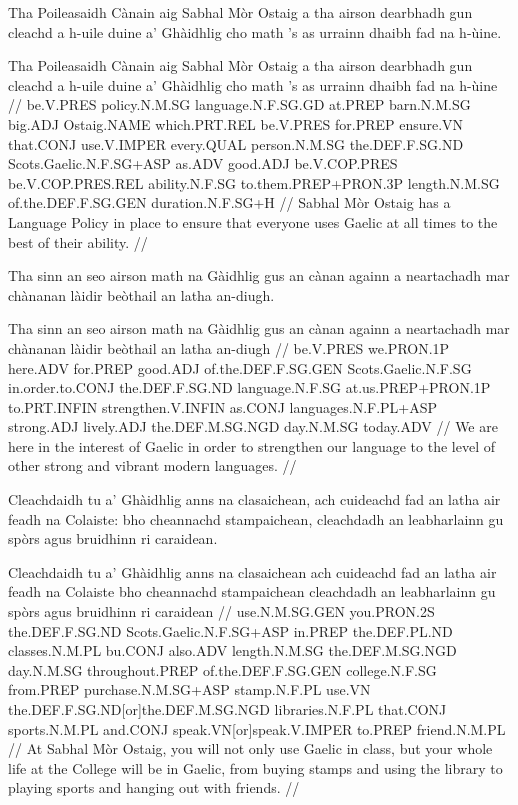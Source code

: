 \documentclass[a4paper,10pt]{article}
\begin{document}
\ex
\begingl
\glpre Tha Poileasaidh Cànain aig Sabhal Mòr Ostaig a tha airson dearbhadh gun cleachd a h-uile duine a' Ghàidhlig cho math 's as urrainn dhaibh fad na h-ùine. 

\vspace{4mm}
\gla Tha Poileasaidh Cànain aig Sabhal Mòr Ostaig a tha airson dearbhadh gun cleachd {a h-uile} duine a' Ghàidhlig cho math 's as urrainn dhaibh fad na h-ùine  //
\glb be.V.PRES policy.N.M.SG language.N.F.SG.GD at.PREP barn.N.M.SG big.ADJ Ostaig.NAME which.PRT.REL be.V.PRES for.PREP ensure.VN that.CONJ use.V.IMPER every.QUAL person.N.M.SG the.DEF.F.SG.ND Scots.Gaelic.N.F.SG+ASP as.ADV good.ADJ be.V.COP.PRES be.V.COP.PRES.REL ability.N.F.SG to.them.PREP+PRON.3P length.N.M.SG of.the.DEF.F.SG.GEN duration.N.F.SG+H  //
\glft Sabhal Mòr Ostaig has a Language Policy in place to ensure that everyone uses Gaelic at all times to the best of their ability. //
\endgl
\xe

\ex
\begingl
\glpre Tha sinn an seo airson math na Gàidhlig gus an cànan againn a neartachadh mar chànanan làidir beòthail an latha an-diugh. 

\vspace{4mm}
\gla Tha sinn {an seo} airson math na Gàidhlig gus an cànan againn a neartachadh mar chànanan làidir beòthail an latha an-diugh  //
\glb be.V.PRES we.PRON.1P here.ADV for.PREP good.ADJ of.the.DEF.F.SG.GEN Scots.Gaelic.N.F.SG in.order.to.CONJ the.DEF.F.SG.ND language.N.F.SG at.us.PREP+PRON.1P to.PRT.INFIN strengthen.V.INFIN as.CONJ languages.N.F.PL+ASP strong.ADJ lively.ADJ the.DEF.M.SG.NGD day.N.M.SG today.ADV  //
\glft We are here in the interest of Gaelic in order to strengthen our language to the level of other strong and vibrant modern languages. //
\endgl
\xe

\ex
\begingl
\glpre Cleachdaidh tu a' Ghàidhlig anns na clasaichean, ach cuideachd fad an latha air feadh na Colaiste: bho cheannachd stampaichean, cleachdadh an leabharlainn gu spòrs agus bruidhinn ri caraidean. 

\vspace{4mm}
\gla Cleachdaidh tu a' Ghàidhlig anns na clasaichean ach cuideachd fad an latha {air feadh} na Colaiste bho cheannachd stampaichean cleachdadh an leabharlainn gu spòrs agus bruidhinn ri caraidean  //
\glb use.N.M.SG.GEN you.PRON.2S the.DEF.F.SG.ND Scots.Gaelic.N.F.SG+ASP in.PREP the.DEF.PL.ND classes.N.M.PL bu.CONJ also.ADV length.N.M.SG the.DEF.M.SG.NGD day.N.M.SG throughout.PREP of.the.DEF.F.SG.GEN college.N.F.SG from.PREP purchase.N.M.SG+ASP stamp.N.F.PL use.VN the.DEF.F.SG.ND[or]the.DEF.M.SG.NGD libraries.N.F.PL that.CONJ sports.N.M.PL and.CONJ speak.VN[or]speak.V.IMPER to.PREP friend.N.M.PL  //
\glft At Sabhal Mòr Ostaig, you will not only use Gaelic in class, but your whole life at the College will be in Gaelic, from buying stamps and using the library to playing sports and hanging out with friends. //
\endgl
\xe
\end{document}
